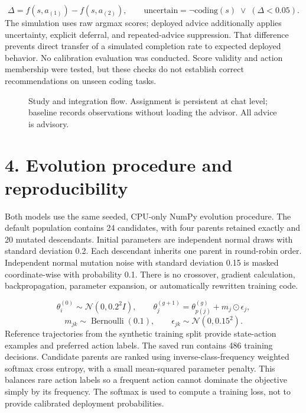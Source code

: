 \documentclass[11pt]{article}
\begin{document}
\[
\Delta=f(s,a_{(1)})-f(s,a_{(2)}),\qquad \mathrm{uncertain}=\neg\mathrm{coding}(s)\;\lor\;(\Delta<0.05).
\]
The simulation uses raw argmax scores; deployed advice additionally applies uncertainty, explicit deferral, and repeated-advice suppression. That difference prevents direct transfer of a simulated completion rate to expected deployed behavior. No calibration evaluation was conducted. Score validity and action membership were tested, but these checks do not establish correct recommendations on unseen coding tasks.

\begin{figure}[htbp]
\centering
{}
\caption{Study and integration flow. Assignment is persistent at chat level; baseline records observations without loading the advisor. All advice is advisory.}
\end{figure}
\section*{4. Evolution procedure and reproducibility}
Both models use the same seeded, CPU-only NumPy evolution procedure. The default population contains 24 candidates, with four parents retained exactly and 20 mutated descendants. Initial parameters are independent normal draws with standard deviation 0.2. Each descendant inherits one parent in round-robin order. Independent normal mutation noise with standard deviation 0.15 is masked coordinate-wise with probability 0.1. There is no crossover, gradient calculation, backpropagation, parameter expansion, or automatically rewritten training code.

\[
\theta_i^{(0)}\sim\mathcal{N}(0,0.2^2 I),\qquad\theta_j^{(g+1)}=\theta_{p(j)}^{(g)}+m_j\odot\epsilon_j,
\]
\[
m_{jk}\sim\operatorname{Bernoulli}(0.1),\qquad\epsilon_{jk}\sim\mathcal{N}(0,0.15^2).
\]
Reference trajectories from the synthetic training split provide state-action examples and preferred action labels. The saved run contains 486 training decisions. Candidate parents are ranked using inverse-class-frequency weighted softmax cross entropy, with a small mean-squared parameter penalty. This balances rare action labels so a frequent action cannot dominate the objective simply by its frequency. The softmax is used to compute a training loss, not to provide calibrated deployment probabilities.
\end{document}
